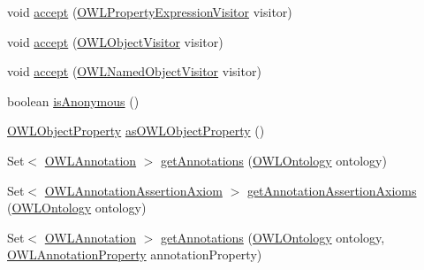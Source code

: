 \begin{DoxyCompactItemize}
\item 
void \hyperlink{classuk_1_1ac_1_1manchester_1_1cs_1_1owl_1_1owlapi_1_1_o_w_l_object_property_impl_ada40f8c00e315ba0ab6eeaae373fdd03}{accept} (\hyperlink{interfaceorg_1_1semanticweb_1_1owlapi_1_1model_1_1_o_w_l_property_expression_visitor}{O\-W\-L\-Property\-Expression\-Visitor} visitor)
\item 
void \hyperlink{classuk_1_1ac_1_1manchester_1_1cs_1_1owl_1_1owlapi_1_1_o_w_l_object_property_impl_ad436a29b4cbf7fe9f65952f58d89842f}{accept} (\hyperlink{interfaceorg_1_1semanticweb_1_1owlapi_1_1model_1_1_o_w_l_object_visitor}{O\-W\-L\-Object\-Visitor} visitor)
\item 
void \hyperlink{classuk_1_1ac_1_1manchester_1_1cs_1_1owl_1_1owlapi_1_1_o_w_l_object_property_impl_aefbc045c9e94276394b681f4fe119b32}{accept} (\hyperlink{interfaceorg_1_1semanticweb_1_1owlapi_1_1model_1_1_o_w_l_named_object_visitor}{O\-W\-L\-Named\-Object\-Visitor} visitor)
\item 
boolean \hyperlink{classuk_1_1ac_1_1manchester_1_1cs_1_1owl_1_1owlapi_1_1_o_w_l_object_property_impl_a119395058352f5700525bbd017545d70}{is\-Anonymous} ()
\item 
\hyperlink{interfaceorg_1_1semanticweb_1_1owlapi_1_1model_1_1_o_w_l_object_property}{O\-W\-L\-Object\-Property} \hyperlink{classuk_1_1ac_1_1manchester_1_1cs_1_1owl_1_1owlapi_1_1_o_w_l_object_property_impl_aabeccfdec2946277879910c326029388}{as\-O\-W\-L\-Object\-Property} ()
\item 
Set$<$ \hyperlink{interfaceorg_1_1semanticweb_1_1owlapi_1_1model_1_1_o_w_l_annotation}{O\-W\-L\-Annotation} $>$ \hyperlink{classuk_1_1ac_1_1manchester_1_1cs_1_1owl_1_1owlapi_1_1_o_w_l_object_property_impl_ab2b407d81c649c79e77b61884acab3f2}{get\-Annotations} (\hyperlink{interfaceorg_1_1semanticweb_1_1owlapi_1_1model_1_1_o_w_l_ontology}{O\-W\-L\-Ontology} ontology)
\item 
Set$<$ \hyperlink{interfaceorg_1_1semanticweb_1_1owlapi_1_1model_1_1_o_w_l_annotation_assertion_axiom}{O\-W\-L\-Annotation\-Assertion\-Axiom} $>$ \hyperlink{classuk_1_1ac_1_1manchester_1_1cs_1_1owl_1_1owlapi_1_1_o_w_l_object_property_impl_ad7e1cd2a128a71a9a380a4f1aa83beef}{get\-Annotation\-Assertion\-Axioms} (\hyperlink{interfaceorg_1_1semanticweb_1_1owlapi_1_1model_1_1_o_w_l_ontology}{O\-W\-L\-Ontology} ontology)
\item 
Set$<$ \hyperlink{interfaceorg_1_1semanticweb_1_1owlapi_1_1model_1_1_o_w_l_annotation}{O\-W\-L\-Annotation} $>$ \hyperlink{classuk_1_1ac_1_1manchester_1_1cs_1_1owl_1_1owlapi_1_1_o_w_l_object_property_impl_a084d57445c5ddcf475f9ad948a5e99c4}{get\-Annotations} (\hyperlink{interfaceorg_1_1semanticweb_1_1owlapi_1_1model_1_1_o_w_l_ontology}{O\-W\-L\-Ontology} ontology, \hyperlink{interfaceorg_1_1semanticweb_1_1owlapi_1_1model_1_1_o_w_l_annotation_property}{O\-W\-L\-Annotation\-Property} annotation\-Property)

\end{DoxyCompactItemize}
